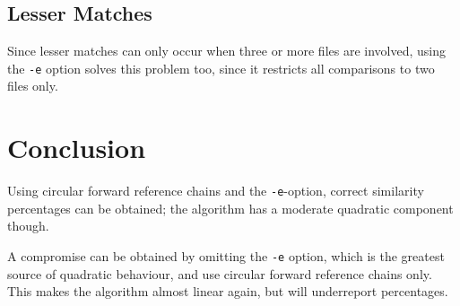 \documentclass[a4paper,fleqn]{article}
\newcommand{\cw}[1]{\texttt{#1}}
\begin{document}
\subsection{Lesser Matches}

Since lesser matches can only occur when three or more files are involved,
using the \cw{-e} option solves this problem too, since it restricts all
comparisons to two files only.

\section{Conclusion}

Using circular forward reference chains and the \cw{-e}-option, correct
similarity percentages can be obtained; the algorithm has a moderate quadratic
component though.

A compromise can be obtained by omitting the \cw{-e} option, which is the
greatest source of quadratic behaviour, and use circular forward reference
chains only. This makes the algorithm almost linear again, but will
underreport percentages.
\end{document}
